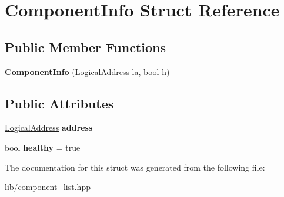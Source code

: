 \hypertarget{structComponentInfo}{}\section{Component\+Info Struct Reference}
\label{structComponentInfo}
\subsection*{Public Member Functions}
\begin{DoxyCompactItemize}
\item 
\mbox{\label{structComponentInfo_aa02e1576e688c7883e97e242a804cff4}} 
{\bfseries Component\+Info} (\hyperlink{structLogicalAddress}{Logical\+Address} la, bool h)
\end{DoxyCompactItemize}
\subsection*{Public Attributes}
\begin{DoxyCompactItemize}
\item 
\mbox{\label{structComponentInfo_a0ebb1e5717838ca670048317eeda0bed}} 
\hyperlink{structLogicalAddress}{Logical\+Address} {\bfseries address}
\item 
\mbox{\label{structComponentInfo_af3eec118fc95855cf27a9825f04a659c}} 
bool {\bfseries healthy} = true
\end{DoxyCompactItemize}


The documentation for this struct was generated from the following file\+:\begin{DoxyCompactItemize}
\item 
lib/component\+\_\+list.\+hpp\end{DoxyCompactItemize}
